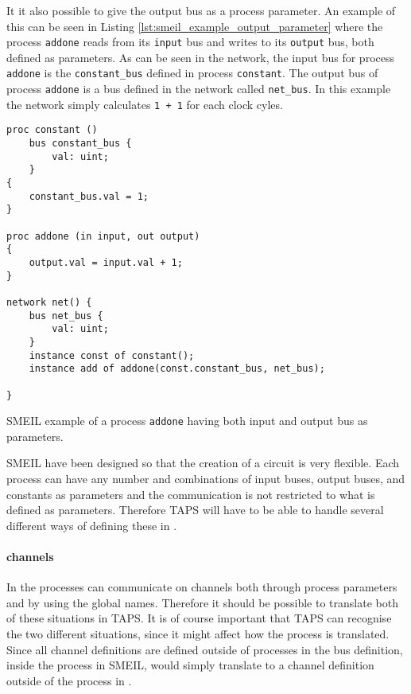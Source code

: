 It it also possible to give the output bus as a process parameter. An example of this can be seen in Listing \ref{lst:smeil_example_output_parameter} where the process \texttt{addone} reads from its \texttt{input} bus and writes to its \texttt{output} bus, both defined as parameters.
As can be seen in the network, the input bus for process \texttt{addone} is the \texttt{constant\_bus} defined in process \texttt{constant}. The output bus of process \texttt{addone} is a bus defined in the network called \texttt{net\_bus}. In this example the network simply calculates \texttt{1 + 1} for each clock cyles.
\begin{listing}
\begin{verbatim}
proc constant ()
    bus constant_bus {
        val: uint;
    }
{
    constant_bus.val = 1;
}

proc addone (in input, out output)
{
    output.val = input.val + 1;
}

network net() {
    bus net_bus {
        val: uint;
    }
    instance const of constant();
    instance add of addone(const.constant_bus, net_bus);

}
\end{verbatim}
\caption{SMEIL example of a process \texttt{addone} having both input and output bus as parameters.}
\label{lst:smeil_example_output_parameter}
\end{listing}

SMEIL have been designed so that the creation of a circuit is very flexible. Each process can have any number and combinations of input buses, output buses, and constants as parameters and the communication is not restricted to what is defined as parameters. Therefore TAPS will have to be able to handle several different ways of defining these in \cspm{}.

\paragraph{\cspm{} channels}
In \cspm{} the processes can communicate on channels both through process parameters and by using the global names. Therefore it should be possible to translate both of these situations in TAPS. It is of course important that TAPS can recognise the two different situations, since it might affect how the process is translated. Since all channel definitions are defined outside of processes in \cspm{} the bus definition, inside the process in SMEIL, would simply translate to a channel definition outside of the process in \cspm{}.

